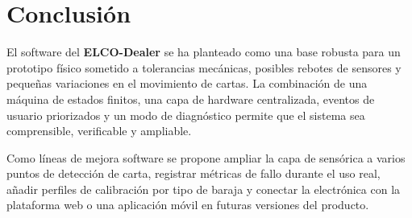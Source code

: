 \documentclass[a4paper, 11pt]{article}
\begin{document}
\newpage
\section{Conclusión}
El software del \textbf{ELCO-Dealer} se ha planteado como una base robusta para un prototipo físico sometido a tolerancias mecánicas, posibles rebotes de sensores y pequeñas variaciones en el movimiento de cartas. La combinación de una máquina de estados finitos, una capa de hardware centralizada, eventos de usuario priorizados y un modo de diagnóstico permite que el sistema sea comprensible, verificable y ampliable.

Como líneas de mejora software se propone ampliar la capa de sensórica a varios puntos de detección de carta, registrar métricas de fallo durante el uso real, añadir perfiles de calibración por tipo de baraja y conectar la electrónica con la plataforma web o una aplicación móvil en futuras versiones del producto.

\nocite{*}

\newpage
\begingroup
\sloppy


\endgroup
\end{document}
